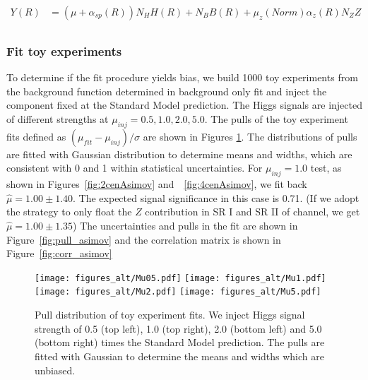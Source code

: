 \begin{equation}
\label{yield_constrain}
\begin{split}
Y(R) &= (\mu + \alpha_{sp}(R))N_{H}H(R)+ N_{B}B(R)+ \mu_{z}(Norm)\alpha_z(R)N_{Z}Z  \\
\end{split}
\end{equation}





\subsubsection{Fit toy experiments}

To determine if the fit procedure yields bias, we build 1000 toy experiments from the background function determined in background only fit and inject the \Zjets{} component fixed at the Standard Model prediction. The Higgs signals are injected of different strengths at $\mu_{inj} = 0.5, 1.0, 2.0, 5.0$. The pulls of the toy experiment fits defined as $(\mu_{fit}-\mu_{inj})/ \sigma$ are shown in Figures \ref{fig:MCToy}. The distributions of pulls are fitted with Gaussian distribution to determine means and widths, which are consistent with 0 and 1 within statistical uncertainties. For $\mu_{inj}=1.0$ test, as shown in Figures~\ref{fig:2cenAsimov} and~~\ref{fig:4cenAsimov}, we fit back $\hat{\mu}=1.00\pm 1.40$. The expected signal significance in this case is 0.71. (If we adopt the strategy to only float the $Z$ contribution in SR I and SR II of \twocentral channel, we get $\hat{\mu}=1.00\pm 1.35$) The uncertainties and pulls in the fit are shown in Figure~\ref{fig:pull_asimov} and the correlation matrix is shown in Figure~\ref{fig:corr_asimov}


\begin{figure}[htbp]
  \centering
 \texttt{[image: figures\_alt/Mu05.pdf]}
 \texttt{[image: figures\_alt/Mu1.pdf]}\\
 \texttt{[image: figures\_alt/Mu2.pdf]}
 \texttt{[image: figures\_alt/Mu5.pdf]}\\
\caption{Pull distribution of toy experiment fits. We inject Higgs signal strength of 0.5 (top left), 1.0 (top right), 2.0 (bottom left) and 5.0 (bottom right) times the Standard Model prediction. The pulls are fitted with Gaussian to determine the means and widths which are unbiased. }
  \label{fig:MCToy}
\end{figure}


